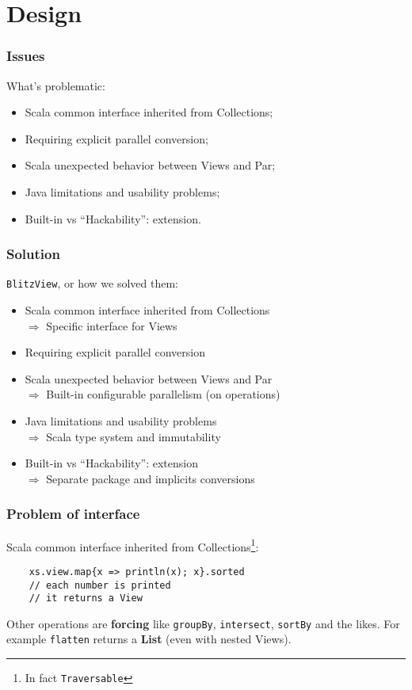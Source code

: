 \documentclass[12pt]{beamer}
\begin{document}
\section{Design}
\begin{frame}
    \frametitle{Issues}
    What's problematic:
    \begin{itemize}
        \item Scala common interface inherited from Collections;
        \item Requiring explicit parallel conversion;
        \item Scala unexpected behavior between Views and Par;
        \item Java limitations and usability problems;
        \item Built-in vs ``Hackability'': extension.
    \end{itemize}
\end{frame}

\begin{frame}
    \frametitle{Solution}
    {\tt BlitzView}, or how we solved them:
    \begin{itemize}
        \item Scala common interface inherited from Collections \\
            $\Rightarrow$ Specific interface for Views
        \item Requiring explicit parallel conversion \\
        \item Scala unexpected behavior between Views and Par \\
            $\Rightarrow$ Built-in configurable parallelism (on operations)
        \item Java limitations and usability problems \\
            $\Rightarrow$ Scala type system and immutability
        \item Built-in vs ``Hackability'': extension \\
            $\Rightarrow$ Separate package and implicits conversions
    \end{itemize}
\end{frame}

\begin{frame}[fragile]
    \frametitle{Problem of interface}
    Scala common interface inherited from Collections\footnote{In fact {\tt Traversable}}:
    \begin{lstlisting}
    xs.view.map{x => println(x); x}.sorted
    // each number is printed
    // it returns a View
    \end{lstlisting}
    Other operations are {\bf forcing} like \verb|groupBy|, \verb|intersect|, \verb|sortBy| and the likes.
    For example \verb|flatten| returns a {\bf List} (even with nested Views).
\end{frame}
\end{document}
